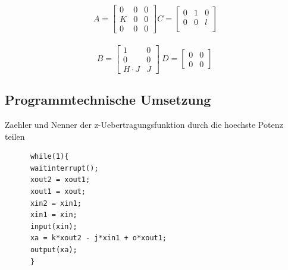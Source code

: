 \documentclass[10pt,a4paper]{article}
\begin{document}
  \begin{mdframed}[style=exercise]
   \[
        \ A = \begin{bmatrix}
            0&0&0\\
            K&0&0\\
            0&0&0
        \end{bmatrix}
        C = \begin{bmatrix}
            0&1&0\\
            0&0&l\\
        \end{bmatrix}\]\\
        \[B = \begin{bmatrix}
            1&0\\
            0&0\\
            H\cdot{}J&J
        \end{bmatrix} \
        D = \begin{bmatrix}
            0&0\\
            0&0
        \end{bmatrix}\]

  \end{mdframed}
  \subsection{Programmtechnische Umsetzung}
Zaehler und Nenner der z-Uebertragungsfunktion durch die hoechste Potenz teilen\\
  \begin{mdframed}[style=exercise]
    \begin{lstlisting}
      while(1){
      waitinterrupt();
      xout2 = xout1;
      xout1 = xout;
      xin2 = xin1;
      xin1 = xin;
      input(xin);
      xa = k*xout2 - j*xin1 + o*xout1;
      output(xa);
      }
    \end{lstlisting}
  \end{mdframed}
\end{document}
